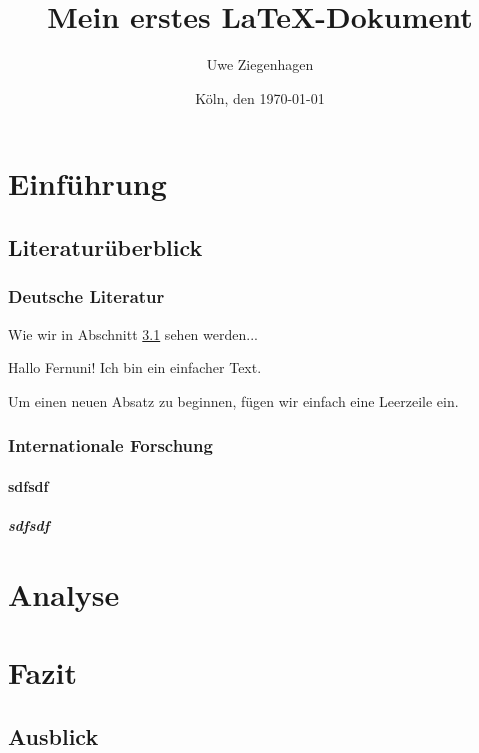 \documentclass[12pt,ngerman,parskip=half]{scrartcl}
\author{Uwe Ziegenhagen}
\title{Mein erstes LaTeX-Dokument}
\date{Köln, den \today} %
\begin{document}
\maketitle

\tableofcontents

\section{Einführung}
\subsection{Literaturüberblick}
\subsubsection{Deutsche Literatur}

Wie wir in Abschnitt \ref{sec:ausblick} sehen werden...

Hallo Fernuni!
Ich bin ein einfacher Text.

Um einen neuen Absatz zu beginnen, fügen wir einfach eine Leerzeile ein.


\subsubsection{Internationale Forschung}

\blindtext

\paragraph{sdfsdf} \blindtext

\subparagraph{sdfsdf} \blindtext


\section{Analyse}

\blindtext[205]


\section{Fazit}

\subsection{Ausblick}\label{sec:ausblick} 

\blindtext
\end{document}
